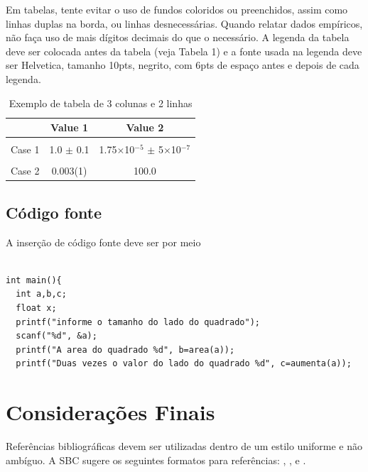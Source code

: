 \documentclass[12pt]{article}
\begin{document}
Em tabelas, tente evitar o uso de fundos coloridos ou preenchidos, assim como linhas duplas na borda, ou linhas desnecessárias. Quando \cite{knuth:84} relatar dados empíricos, não faça uso de mais dígitos decimais do que o necessário. A legenda da tabela deve ser colocada antes da tabela (veja Tabela 1) e a fonte usada na legenda deve ser Helvetica, tamanho 10pts, negrito, com 6pts de espaço antes e depois de cada legenda.

\begin{table}[!ht]
\centering
\caption{Exemplo de tabela de 3 colunas e 2 linhas}
\label{tab:exTable1}
\smallskip
\begin{tabular}{l c c}
\hline
& Value 1 & Value 2\\[0.5ex]
\hline
&&\\[-2ex]
Case 1 & 1.0 $\pm$ 0.1 & 1.75$\times$10$^{-5}$ $\pm$ 5$\times$10$^{-7}$\\[0.5ex]
\hline
&&\\[-2ex]
Case 2 & 0.003(1) & 100.0\\[0.5ex]
\hline
\end{tabular}
\end{table}

\subsection{Código fonte}
A inserção de código fonte deve ser por meio

\begin{lstlisting}

int main(){
  int a,b,c;
  float x;
  printf("informe o tamanho do lado do quadrado");
  scanf("%d", &a);
  printf("A area do quadrado %d", b=area(a));
  printf("Duas vezes o valor do lado do quadrado %d", c=aumenta(a));

\end{lstlisting}



\section{Considerações Finais}

Referências bibliográficas devem ser utilizadas dentro de um estilo uniforme e não ambíguo. A SBC sugere os seguintes formatos para referências: \cite{knuth:84}, \cite{boulic:91}, e \cite{smith:99}.



\end{document}
